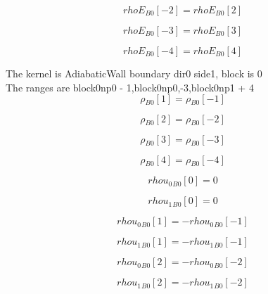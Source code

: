 \documentclass{article}
\begin{document}
\begin{dmath}{rhoE{_{B0}}}[{-2}] = {rhoE{_{B0}}}[{2}]\end{dmath}

\begin{dmath}{rhoE{_{B0}}}[{-3}] = {rhoE{_{B0}}}[{3}]\end{dmath}

\begin{dmath}{rhoE{_{B0}}}[{-4}] = {rhoE{_{B0}}}[{4}]\end{dmath}

\noindent The kernel is AdiabaticWall boundary dir0 side1, block is 0\\\noindent The ranges are block0np0 - 1,block0np0,-3,block0np1 + 4\\\begin{dmath}{\rho{_{B0}}}[{1}] = {\rho{_{B0}}}[{-1}]\end{dmath}

\begin{dmath}{\rho{_{B0}}}[{2}] = {\rho{_{B0}}}[{-2}]\end{dmath}

\begin{dmath}{\rho{_{B0}}}[{3}] = {\rho{_{B0}}}[{-3}]\end{dmath}

\begin{dmath}{\rho{_{B0}}}[{4}] = {\rho{_{B0}}}[{-4}]\end{dmath}

\begin{dmath}{rhou_{0}{_{B0}}}[{0}] = 0\end{dmath}

\begin{dmath}{rhou_{1}{_{B0}}}[{0}] = 0\end{dmath}

\begin{dmath}{rhou_{0}{_{B0}}}[{1}] = - {rhou_{0}{_{B0}}}[{-1}]\end{dmath}

\begin{dmath}{rhou_{1}{_{B0}}}[{1}] = - {rhou_{1}{_{B0}}}[{-1}]\end{dmath}

\begin{dmath}{rhou_{0}{_{B0}}}[{2}] = - {rhou_{0}{_{B0}}}[{-2}]\end{dmath}

\begin{dmath}{rhou_{1}{_{B0}}}[{2}] = - {rhou_{1}{_{B0}}}[{-2}]\end{dmath}
\end{document}
